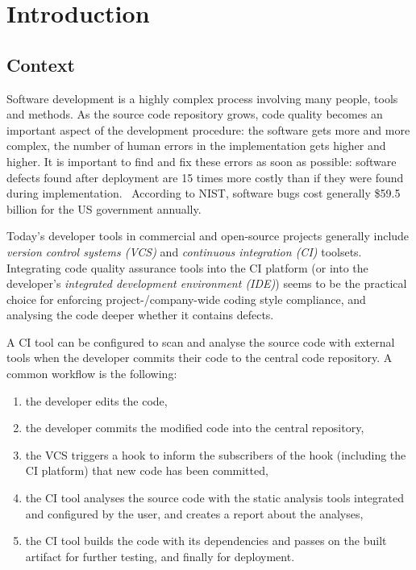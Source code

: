 \chapter{Introduction}


\section{Context}

Software development is a highly complex process involving many people, tools and methods. As the source code repository grows, code quality becomes an important aspect of the development procedure: the software gets more and more complex, the number of human errors in the implementation gets higher and higher. It is important to find and fix these errors as soon as possible: software defects found after deployment are 15 times more costly than if they were found during implementation.~\cite{dawson2010integrating} According to NIST, software bugs cost generally \$59.5 billion for the US government annually.~\cite{tassey2002economic}

Today's developer tools in commercial and open-source projects generally include \emph{version control systems (VCS)} and \emph{continuous integration (CI)} toolsets.~\cite{hilton2016usage}~\cite{fowlerCI} Integrating code quality assurance tools into the CI platform (or into the developer's \emph{integrated development environment (IDE)}) seems to be the practical choice for enforcing project-/company-wide coding style compliance, and analysing the code deeper whether it contains defects.

A CI tool can be configured to scan and analyse the source code with external tools when the developer commits their code to the central code repository. A common workflow is the following:

\begin{enumerate}
\item the developer edits the code,
\item the developer commits the modified code into the central repository,
\item the VCS triggers a hook to inform the subscribers of the hook (including the CI platform) that new code has been committed,
\item the CI tool analyses the source code with the static analysis tools integrated and configured by the user, and creates a report about the analyses,
\item the CI tool builds the code with its dependencies and passes on the built artifact for further testing, and finally for deployment.
\end{enumerate}

